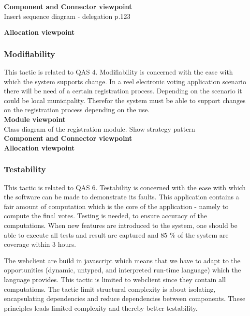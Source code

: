 \noindent
\textbf{Component and Connector viewpoint}\\
Insert sequence diagram - delegation p.123\\
\begin{center}
\end{center}

\noindent
\textbf{Allocation viewpoint}\\



\noindent
\subsubsection{Modifiability}
This tactic is related to QAS 4. Modifiability is concerned with the ease with which the system supports change. In a reel electronic voting application scenario there will be need of a certain registration process. Depending on the scenario it could be local municipality. Therefor the system must be able to support changes on the registration process depending on the use.  \\


\noindent
\textbf{Module viewpoint}\\
Class diagram of the registration module. Show strategy pattern\\

\noindent
\textbf{Component and Connector viewpoint}\\

\noindent
\textbf{Allocation viewpoint}\\

\noindent
\subsubsection{Testability}
This tactic is related to QAS 6. Testability is concerned with the ease with which the software can be made to demonstrate its faults. This application contains a fair amount of computation which is the core of the application - namely to compute the final votes. Testing is needed, to ensure accuracy of the computations. When new features are introduced to the system, one should be able to execute all tests and result are captured and 85 \% of the system are coverage within 3 hours.


\begin{center}
\end{center}
\noindent
The webclient are build in javascript which means that we have to adapt to the opportunities (dynamic, untyped, and interpreted run-time language) which the language provides. This tactic is limited to webclient since they contain all computations. The tactic limit structural complexity is about isolating, encapsulating dependencies and reduce dependencies between components. These principles leads limited complexity and thereby better testability.   \\

